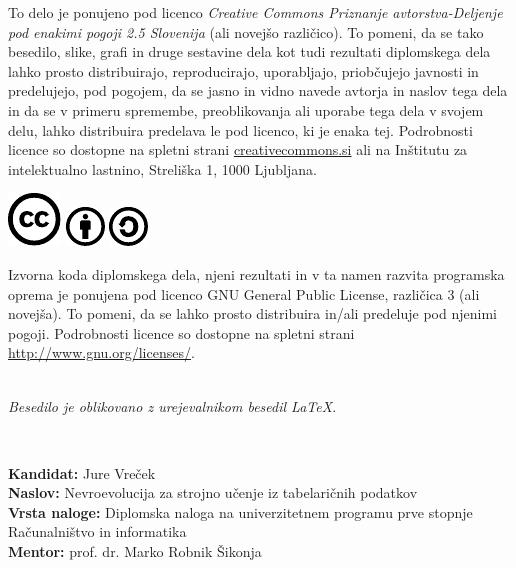 \documentclass[a4paper,12pt,openright]{book}
\newcommand{\clearemptydoublepage}{\newpage{\pagestyle{empty}\cleardoublepage}}
\newcommand{\CcImageCc}[1]{%
    \includegraphics[scale=#1]{cc_cc_30.pdf}%
}
\newcommand{\CcImageBy}[1]{%
    \includegraphics[scale=#1]{cc_by_30.pdf}%
}
\newcommand{\CcImageSa}[1]{%
    \includegraphics[scale=#1]{cc_sa_30.pdf}%
}
\begin{document}
    \vspace*{5cm}
    {\small \noindent
    To delo je ponujeno pod licenco \textit{Creative Commons Priznanje avtorstva-Deljenje pod enakimi pogoji 2.5 Slovenija} (ali novej\v so razli\v cico).
    To pomeni, da se tako besedilo, slike, grafi in druge sestavine dela kot tudi rezultati diplomskega dela lahko prosto distribuirajo,
        reproducirajo, uporabljajo, priobčujejo javnosti in predelujejo, pod pogojem, da se jasno in vidno navede avtorja in naslov tega
    dela in da se v primeru spremembe, preoblikovanja ali uporabe tega dela v svojem delu, lahko distribuira predelava le pod
    licenco, ki je enaka tej.
    Podrobnosti licence so dostopne na spletni strani \href{http://creativecommons.si}{creativecommons.si} ali na Inštitutu za
    intelektualno lastnino, Streliška 1, 1000 Ljubljana.

    \vspace*{1cm}
        \begin{center}%
            \CcImageCc{0.741573033707865}\hspace*{1ex}\CcImageBy{1}\hspace*{1ex}\CcImageSa{1}%
        \end{center}
    }

    \vspace*{1cm}
    {\small \noindent
    Izvorna koda diplomskega dela, njeni rezultati in v ta namen razvita programska oprema je ponujena pod licenco GNU General Public License,
        različica 3 (ali novejša). To pomeni, da se lahko prosto distribuira in/ali predeluje pod njenimi pogoji.
    Podrobnosti licence so dostopne na spletni strani \url{http://www.gnu.org/licenses/}.
    }

    \vfill
    \begin{center}
        \ \\ \vfill
        {\em
        Besedilo je oblikovano z urejevalnikom besedil \LaTeX.}
    \end{center}

    \clearemptydoublepage

    \thispagestyle{empty}
    \
    \vfill

    \bigskip
    \noindent\textbf{Kandidat:} Jure Vreček\\
    \noindent\textbf{Naslov:} Nevroevolucija za strojno učenje iz tabelaričnih podatkov\\
    \noindent\textbf{Vrsta naloge:} Diplomska naloga na univerzitetnem programu prve stopnje Računalništvo in informatika \\
    \noindent\textbf{Mentor:} prof. dr. Marko Robnik Šikonja\\
\end{document}
